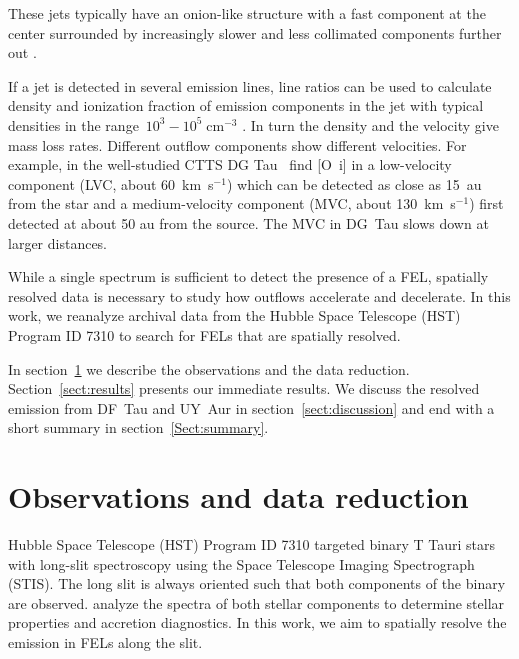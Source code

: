 \documentclass[twocolumn,trackchanges]{aastex63}
\begin{document}
These jets typically have an onion-like
structure with a fast component at the center surrounded by increasingly
slower and less collimated components further
out \citep{2000ApJ...537L..49B}.

If a
jet is detected in several emission lines, line ratios can be used to
calculate density and ionization fraction of emission components in the
jet with typical densities in the range~$10^3-10^5\;\mathrm{cm}^{-3}$
\citep[e.g.][]{1993ApJ...410L..31S,1999A&A...342..717B,2000A&A...356L..41L,2013A&A...550L...1S}. In turn
the density and the velocity give mass loss rates. Different outflow
components show different velocities. For example, in the well-studied
CTTS DG Tau~\citet{2013A&A...550L...1S} find [O~{\sc i}] in a low-velocity
component (LVC, about 60~km~s$^{-1}$) which can be detected as
close as 15~au from the star and a medium-velocity component (MVC, about
130~km~s$^{-1}$) first detected at about 50 au from the source. The MVC in DG~Tau
slows down at larger distances. 

While a single spectrum is sufficient to
detect the presence of a FEL, spatially resolved data is necessary to study
how outflows accelerate and decelerate. In this work, we reanalyze
archival data from the Hubble Space Telescope (HST) Program ID 7310 to
search for FELs that are spatially resolved.

In section~\ref{sect:obs} we describe the observations and the data reduction. Section~\ref{sect:results} presents our immediate results. We discuss the resolved emission from DF~Tau and UY~Aur in section~\ref{sect:discussion} and end with a short summary in section~\ref{Sect:summary}.

\section{Observations and data reduction}
\label{sect:obs}



Hubble Space Telescope (HST) Program ID 7310 targeted binary T Tauri
stars with long-slit spectroscopy using the Space Telescope Imaging
Spectrograph (STIS). The long slit is always oriented such that both
components of the binary are observed. \citet{2003ApJ...583..334H} analyze the
spectra of both stellar components to determine stellar properties and
accretion diagnostics. In this work, we aim to spatially resolve the
emission in FELs along the slit.
\end{document}
